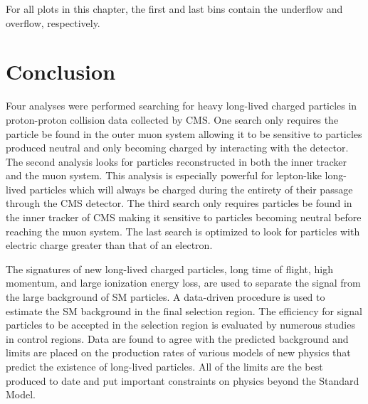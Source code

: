 For all plots in this chapter, the first and last bins contain the underflow and overflow, respectively.



















\section{Conclusion}
Four analyses were performed searching for heavy long-lived charged particles in proton-proton collision data collected by CMS. One search only requires the particle be found
in the outer muon system allowing it to be sensitive to particles produced neutral and only becoming charged by interacting with the detector. The second analysis looks
for particles reconstructed in both the inner tracker and the muon system. This analysis is especially powerful for lepton-like long-lived particles which will always be charged
during the entirety of their passage through the CMS detector. The third search only requires particles be found in the inner tracker of CMS making it sensitive
to particles becoming neutral before reaching the muon system. The last search is optimized to look for particles with electric charge greater than that of
an electron.

The signatures of new long-lived charged particles, long time of flight, high momentum, and large ionization
energy loss, are used to separate the signal from the large background of SM particles.
A data-driven procedure is used to estimate the SM background in the
final selection region. The efficiency for signal particles to be accepted in the selection region is evaluated by numerous studies in control regions.
Data are found to agree with the predicted background and limits are placed on the production rates of various models of new physics that predict
the existence of long-lived particles. All of the limits are the best produced to date and put important constraints on physics beyond the Standard Model.